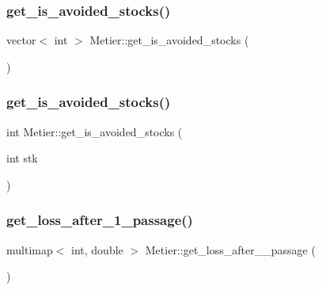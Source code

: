 \mbox{\label{class_metier_aff78d2e35871a94a165ee73d3d744a6a}} 
\subsubsection{\texorpdfstring{get\_is\_avoided\_stocks()}{get\_is\_avoided\_stocks()}\hspace{0.1cm}{\footnotesize\ttfamily [1/2]}}
{\footnotesize\ttfamily vector$<$ int $>$ Metier\+::get\+\_\+is\+\_\+avoided\+\_\+stocks (\begin{DoxyParamCaption}{ }\end{DoxyParamCaption})}

\mbox{\label{class_metier_a59dac52ffca8180db8a427d195e1ad9f}} 
\subsubsection{\texorpdfstring{get\_is\_avoided\_stocks()}{get\_is\_avoided\_stocks()}\hspace{0.1cm}{\footnotesize\ttfamily [2/2]}}
{\footnotesize\ttfamily int Metier\+::get\+\_\+is\+\_\+avoided\+\_\+stocks (\begin{DoxyParamCaption}\item[{int}]{stk }\end{DoxyParamCaption})}

\mbox{\label{class_metier_a52d2fd0d7c168bec25f9d9b261f299ab}} 
\subsubsection{\texorpdfstring{get\_loss\_after\_1\_passage()}{get\_loss\_after\_1\_passage()}}
{\footnotesize\ttfamily multimap$<$ int, double $>$ Metier\+::get\+\_\+loss\+\_\+after\+\_\+\_\+passage (\begin{DoxyParamCaption}{ }\end{DoxyParamCaption})}

